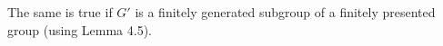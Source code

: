 The same is true if $G'$ is a finitely generated subgroup of a finitely presented group (using Lemma 4.5).
